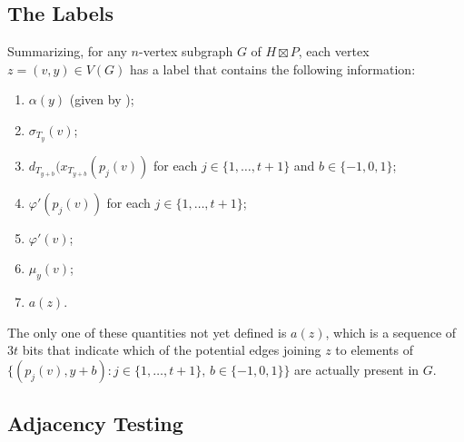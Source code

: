 \documentclass[kpfonts]{patmorin}
\newcommand{\snote}[1]{\fcolorbox{red}{yellow}{#1}}
\begin{document}
\subsection{The Labels}

Summarizing, for any $n$-vertex subgraph $G$ of $H\boxtimes P$, each vertex $z=(v,y)\in V(G)$ has a label that contains the following information:

\begin{enumerate}[(PC1)]
  \item $\alpha(y)$ (given by );%
  \item $\sigma_{T_y}(v)$; %
  \item $d_{T_{y+b}}(x_{T_{y+b}}(p_j(v))$ for each $j\in\{1,\ldots,t+1\}$ and $b\in\{-1,0,1\}$; 
  \item $\varphi'(p_j(v))$ for each $j\in\{1,\ldots,t+1\}$;
  \item $\varphi'(v)$;
  \item $\mu_y(v)$;
  \item $a(z)$.
\end{enumerate}
The only one of these quantities not yet defined is $a(z)$, which is a sequence of $3t$ bits that indicate which of the potential edges joining $z$ to elements of $\{(p_j(v),y+b): j\in\{1,\ldots,t+1\},\, b\in\{-1,0,1\}\}$ are actually present in $G$.

\subsection{Adjacency Testing}
\end{document}
